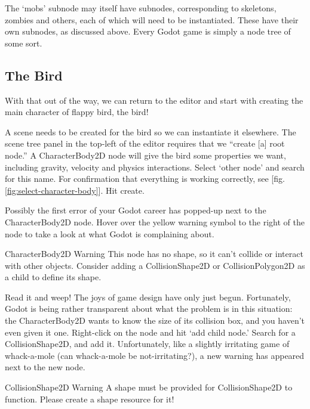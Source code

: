 \documentclass[14pt]{extarticle}
\newcommand{\prettyref}[2]{[{#1}.\ref{#2}]}
\begin{document}
The `mobs' subnode may itself have subnodes, corresponding to skeletons, zombies and others, each of which will need to be instantiated. These have their own subnodes, as discussed above. Every Godot game is simply a node tree of some sort.

\subsection*{The Bird}
With that out of the way, we can return to the editor and start with creating the main character of flappy bird, the bird!

A scene needs to be created for the bird so we can instantiate it elsewhere. The scene tree panel in the top-left of the editor requires that we ``create [a] root node.'' A CharacterBody2D node will give the bird some properties we want, including gravity, velocity and physics interactions. Select `other node' and search for this name. For confirmation that everything is working correctly, see \prettyref{fig}{fig:select-character-body}. Hit create.


Possibly the first error of your Godot career has popped-up next to the CharacterBody2D node. Hover over the yellow warning symbol to the right of the node to take a look at what Godot is complaining about.

\begin{callout-warning}{CharacterBody2D Warning}
This node has no shape, so it can't collide or interact with other objects. Consider adding a CollisionShape2D or CollisionPolygon2D as a child to define its shape.
\end{callout-warning}

Read it and weep! The joys of game design have only just begun. Fortunately, Godot is being rather transparent about what the problem is in this situation: the CharacterBody2D wants to know the size of its collision box, and you haven't even given it one. Right-click on the node and hit `add child node.' Search for a CollisionShape2D, and add it. Unfortunately, like a slightly irritating game of whack-a-mole (can whack-a-mole be not-irritating?), a new warning has appeared next to the new node.

\begin{callout-warning}{CollisionShape2D Warning}
A shape must be provided for CollisionShape2D to function. Please create a shape resource for it!
\end{callout-warning}
\end{document}
